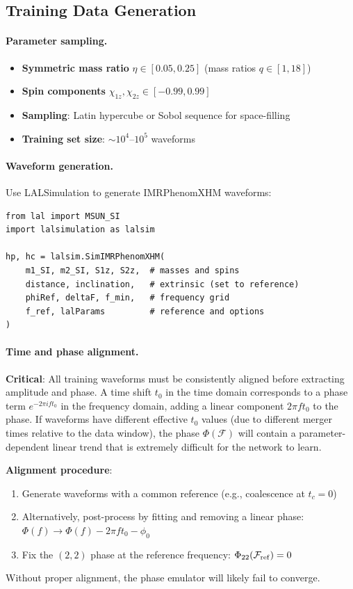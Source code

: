 \documentclass[11pt,a4paper]{article}
\newcommand{\Mf}{\mathcal{F}}
\begin{document}
\subsection{Training Data Generation}

\paragraph{Parameter sampling.}
\begin{itemize}
    \item \textbf{Symmetric mass ratio} $\eta \in [0.05, 0.25]$ (mass ratios $q \in [1, 18]$)
    \item \textbf{Spin components} $\chi_{1z}, \chi_{2z} \in [-0.99, 0.99]$
    \item \textbf{Sampling}: Latin hypercube or Sobol sequence for space-filling
    \item \textbf{Training set size}: $\sim 10^4$--$10^5$ waveforms
\end{itemize}

\paragraph{Waveform generation.}
Use LALSimulation to generate IMRPhenomXHM waveforms:
\begin{verbatim}
from lal import MSUN_SI
import lalsimulation as lalsim

hp, hc = lalsim.SimIMRPhenomXHM(
    m1_SI, m2_SI, S1z, S2z,  # masses and spins
    distance, inclination,   # extrinsic (set to reference)
    phiRef, deltaF, f_min,   # frequency grid
    f_ref, lalParams         # reference and options
)
\end{verbatim}

\paragraph{Time and phase alignment.}
\textbf{Critical}: All training waveforms must be consistently aligned before extracting amplitude and phase. A time shift $t_0$ in the time domain corresponds to a phase term $e^{-2\pi i f t_0}$ in the frequency domain, adding a linear component $2\pi f t_0$ to the phase. If waveforms have different effective $t_0$ values (due to different merger times relative to the data window), the phase $\Phi(\Mf)$ will contain a parameter-dependent linear trend that is extremely difficult for the network to learn.

\textbf{Alignment procedure}:
\begin{enumerate}
    \item Generate waveforms with a common reference (e.g., coalescence at $t_c = 0$)
    \item Alternatively, post-process by fitting and removing a linear phase: $\Phi(f) \to \Phi(f) - 2\pi f t_0 - \phi_0$
    \item Fix the $(2,2)$ phase at the reference frequency: $\Phi_{22}(\Mf_{\rm ref}) = 0$
\end{enumerate}
Without proper alignment, the phase emulator will likely fail to converge.
\end{document}

